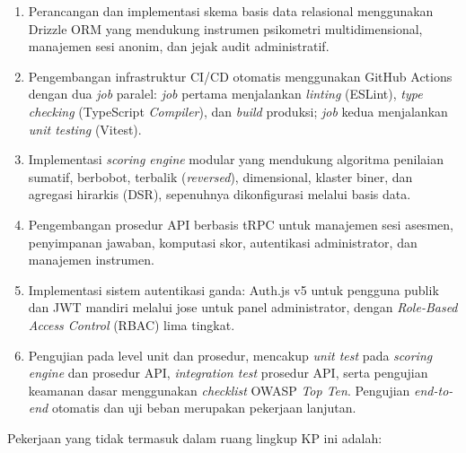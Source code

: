 \begin{enumerate}[leftmargin=2cm]
  \item Perancangan dan implementasi skema basis data relasional menggunakan Drizzle ORM yang mendukung instrumen psikometri multidimensional, manajemen sesi anonim, dan jejak audit administratif.
  \item Pengembangan infrastruktur CI/CD otomatis menggunakan GitHub Actions dengan dua \textit{job} paralel: \textit{job} pertama menjalankan \textit{linting} (ESLint), \textit{type checking} (TypeScript \textit{Compiler}), dan \textit{build} produksi; \textit{job} kedua menjalankan \textit{unit testing} (Vitest).
  \item Implementasi \textit{scoring engine} modular yang mendukung algoritma penilaian sumatif, berbobot, terbalik (\textit{reversed}), dimensional, klaster biner, dan agregasi hirarkis (DSR), sepenuhnya dikonfigurasi melalui basis data.
  \item Pengembangan prosedur API berbasis tRPC untuk manajemen sesi asesmen, penyimpanan jawaban, komputasi skor, autentikasi administrator, dan manajemen instrumen.
  \item Implementasi sistem autentikasi ganda: Auth.js v5 untuk pengguna publik dan JWT mandiri melalui jose untuk panel administrator, dengan \textit{Role-Based Access Control} (RBAC) lima tingkat.
  \item Pengujian pada level unit dan prosedur, mencakup \textit{unit test} pada \textit{scoring engine} dan prosedur API, \textit{integration test} prosedur API, serta pengujian keamanan dasar menggunakan \textit{checklist} OWASP \textit{Top Ten}. Pengujian \textit{end-to-end} otomatis dan uji beban merupakan pekerjaan lanjutan.
\end{enumerate}

Pekerjaan yang tidak termasuk dalam ruang lingkup KP ini adalah:

